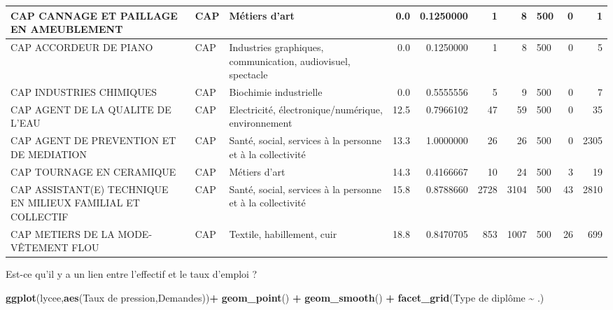 \documentclass[
]{book}
\newenvironment{Shaded}{\begin{snugshade}}{\end{snugshade}}
\newcommand{\AttributeTok}[1]{\textcolor[rgb]{0.13,0.29,0.53}{#1}}
\newcommand{\FunctionTok}[1]{\textcolor[rgb]{0.13,0.29,0.53}{\textbf{#1}}}
\newcommand{\NormalTok}[1]{#1}
\newcommand{\SpecialCharTok}[1]{\textcolor[rgb]{0.81,0.36,0.00}{\textbf{#1}}}
\newcommand{\StringTok}[1]{\textcolor[rgb]{0.31,0.60,0.02}{#1}}
\begin{document}
\begin{tabular}{l|l|l|r|r|r|r|l|r|r}
\hline
CAP CANNAGE ET PAILLAGE EN AMEUBLEMENT & CAP & Métiers d'art & 0.0 & 0.1250000 & 1 & 8 & 500 & 0 & 1\\
\hline
CAP ACCORDEUR DE PIANO & CAP & Industries graphiques, communication, audiovisuel, spectacle & 0.0 & 0.1250000 & 1 & 8 & 500 & 0 & 5\\
\hline
CAP INDUSTRIES CHIMIQUES & CAP & Biochimie industrielle & 0.0 & 0.5555556 & 5 & 9 & 500 & 0 & 7\\
\hline
CAP AGENT DE LA QUALITE DE L'EAU & CAP & Electricité, électronique/numérique, environnement & 12.5 & 0.7966102 & 47 & 59 & 500 & 0 & 35\\
\hline
CAP AGENT DE PREVENTION ET DE MEDIATION & CAP & Santé, social, services à la personne et à la collectivité & 13.3 & 1.0000000 & 26 & 26 & 500 & 0 & 2305\\
\hline
CAP TOURNAGE EN CERAMIQUE & CAP & Métiers d'art & 14.3 & 0.4166667 & 10 & 24 & 500 & 3 & 19\\
\hline
CAP ASSISTANT(E) TECHNIQUE EN MILIEUX FAMILIAL ET COLLECTIF & CAP & Santé, social, services à la personne et à la collectivité & 15.8 & 0.8788660 & 2728 & 3104 & 500 & 43 & 2810\\
\hline
CAP METIERS DE LA MODE-VÊTEMENT FLOU & CAP & Textile, habillement, cuir & 18.8 & 0.8470705 & 853 & 1007 & 500 & 26 & 699\\
\hline
\end{tabular}

Est-ce qu'il y a un lien entre l'effectif et le taux d'emploi ?

\begin{Shaded}
\begin{Highlighting}[]
\FunctionTok{ggplot}\NormalTok{(lycee,}\FunctionTok{aes}\NormalTok{(}\StringTok{\textasciigrave{}}\AttributeTok{Taux de pression}\StringTok{\textasciigrave{}}\NormalTok{,}\StringTok{\textasciigrave{}}\AttributeTok{Demandes}\StringTok{\textasciigrave{}}\NormalTok{))}\SpecialCharTok{+}
  \FunctionTok{geom\_point}\NormalTok{() }\SpecialCharTok{+} \FunctionTok{geom\_smooth}\NormalTok{()  }\SpecialCharTok{+} \FunctionTok{facet\_grid}\NormalTok{(}\StringTok{\textasciigrave{}}\AttributeTok{Type de diplôme}\StringTok{\textasciigrave{}} \SpecialCharTok{\textasciitilde{}}\NormalTok{ .) }
\end{Highlighting}
\end{Shaded}
\end{document}
